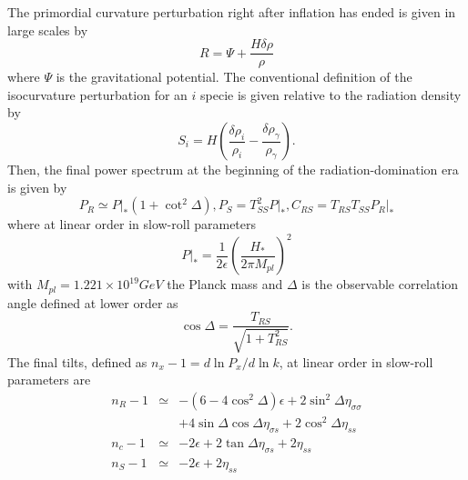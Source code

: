 \documentclass[amssymb,twocolumn,prd,nofootinbib,showpacs]{revtex4-1}
\begin{document}
The primordial curvature perturbation right after inflation has ended is given in large scales by
\begin{equation}
R=\Psi+\frac{H\delta\rho}{\rho}
\end{equation}
where $\Psi$ is the gravitational potential. The conventional definition of the isocurvature perturbation for an $i$ specie is given relative to the radiation density by
\begin{equation}
S_i=H\left(\frac{\delta\rho_{i}}{\rho_{i}}-\frac{\delta\rho_\gamma}{\rho_\gamma}\right).
\end{equation}
Then, the final power spectrum at the beginning of the radiation-domination era is given by
\begin{subequations}\label{spectrums}
\begin{equation}\label{PRf}
P_R\simeq P|_*(1+\cot^2\Delta),
\end{equation}
\begin{equation}\label{isosecond}
P_S=T^2_{SS}P|_*,
\end{equation}
\begin{equation}
C_{RS}=T_{RS}T_{SS}P_R|_*
\end{equation}
\end{subequations}
where at linear order in slow-roll parameters
\begin{equation}
P|_*=\frac{1}{2\epsilon}\left(\frac{H_*}{2\pi M_{pl}}\right)^2
\end{equation}
with $M_{pl}=1.221\times 10^{19}GeV$ the Planck mass and $\Delta$ is the observable correlation angle defined at lower order as
\begin{equation}
\cos\Delta =\frac{T_{RS}}{\sqrt{1+T_{RS}^2}}.
\end{equation}
The final tilts, defined as $n_x-1=d\ln P_x/d\ln k$, at linear order in slow-roll parameters are
\begin{subequations}\label{tilts}
\begin{eqnarray}
n_R-1&\simeq & -(6-4\cos^2\Delta)\epsilon+2\sin^2\Delta\eta_{\sigma\sigma}\nonumber \\ &&+4\sin\Delta\cos\Delta\eta_{\sigma s}+2\cos^2\Delta\eta_{ss}\\
n_c-1&\simeq &-2\epsilon+2\tan\Delta\eta_{\sigma s}+2\eta_{ss}\\
n_S-1&\simeq & -2\epsilon+2\eta_{ss}
\end{eqnarray}
\end{subequations}
\end{document}
